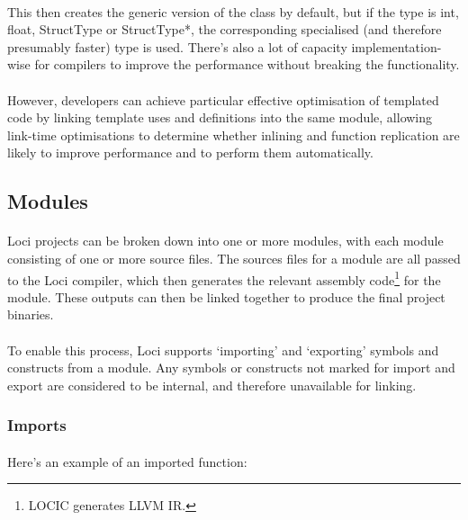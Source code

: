 \documentclass[12pt,twoside,notitlepage]{report}
\begin{document}
\paragraph{}
This then creates the generic version of the class by default, but if the type is int, float, StructType or StructType*, the corresponding specialised (and therefore presumably faster) type is used. There's also a lot of capacity implementation-wise for compilers to improve the performance without breaking the functionality.

\paragraph{}
However, developers can achieve particular effective optimisation of templated code by linking template uses and definitions into the same module, allowing link-time optimisations to determine whether inlining and function replication are likely to improve performance and to perform them automatically.

\clearpage

\subsection{Modules}

\paragraph{}
Loci projects can be broken down into one or more modules, with each module consisting of one or more source files. The sources files for a module are all passed to the Loci compiler, which then generates the relevant assembly code\footnote{LOCIC generates LLVM IR.} for the module. These outputs can then be linked together to produce the final project binaries.

\paragraph{}
To enable this process, Loci supports `importing' and `exporting' symbols and constructs from a module. Any symbols or constructs not marked for import and export are considered to be internal, and therefore unavailable for linking.

\subsubsection{Imports}

\paragraph{}
Here's an example of an imported function:
\end{document}
